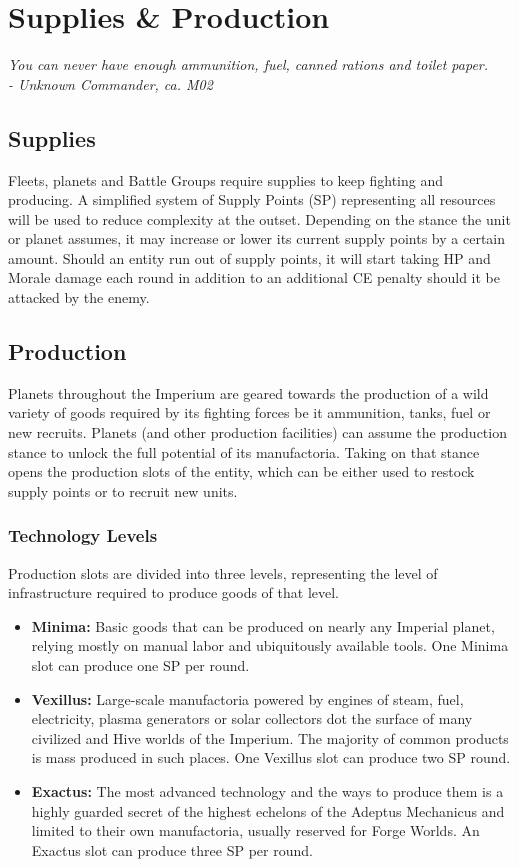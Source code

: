 \chapter{Supplies \& Production}
\textit{You can never have enough ammunition, fuel, canned rations and toilet paper. \\- Unknown Commander, ca. M02}
\section{Supplies}
Fleets, planets and Battle Groups require supplies to keep fighting and producing. 
A simplified system of Supply Points (SP) representing all resources will be used to reduce complexity at the outset.
Depending on the stance the unit or planet assumes, it may increase or lower its current supply points by a certain amount.
Should an entity run out of supply points, it will start taking HP and Morale damage each round in addition to an additional CE penalty should it be attacked by the enemy.


\section{Production}
Planets throughout the Imperium are geared towards the production of a wild variety of goods required by its fighting forces be it ammunition, tanks, fuel or new recruits.
Planets (and other production facilities) can assume the production stance to unlock the full potential of its manufactoria.
Taking on that stance opens the production slots of the entity, which can be either used to restock supply points or to recruit new units.

\subsection{Technology Levels}
Production slots are divided into three levels, representing the level of infrastructure required to produce goods of that level.
\begin{itemize}
	\item \textbf{Minima:} Basic goods that can be produced on nearly any Imperial planet, relying mostly on manual labor and ubiquitously available tools. One Minima slot can produce one SP per round.
	\item \textbf{Vexillus:} Large-scale manufactoria powered by engines of steam, fuel, electricity, plasma generators or solar collectors dot the surface of many civilized and Hive worlds of the Imperium. The majority of common products is mass produced in such places. One Vexillus slot can produce two SP round.
	\item \textbf{Exactus:} The most advanced technology and the ways to produce them is a highly guarded secret of the highest echelons of the Adeptus Mechanicus and limited to their own manufactoria, usually reserved for Forge Worlds. An Exactus slot can produce three SP per round.
\end{itemize}

